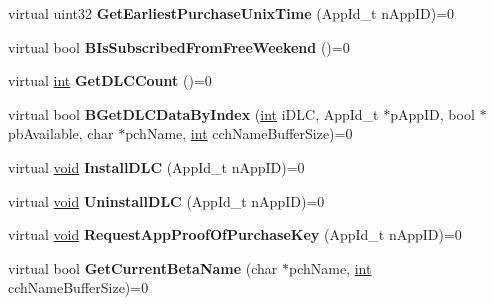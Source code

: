 \begin{DoxyCompactItemize}
\item 
\hypertarget{classISteamApps_ac1c6be2c2d7337812994ddb4d8c04bf0}{}virtual uint32 {\bfseries Get\+Earliest\+Purchase\+Unix\+Time} (App\+Id\+\_\+t n\+App\+I\+D)=0\label{classISteamApps_ac1c6be2c2d7337812994ddb4d8c04bf0}

\item 
\hypertarget{classISteamApps_a513d6e5bb54c2885557f104279c02672}{}virtual bool {\bfseries B\+Is\+Subscribed\+From\+Free\+Weekend} ()=0\label{classISteamApps_a513d6e5bb54c2885557f104279c02672}

\item 
\hypertarget{classISteamApps_ac8002fc5232fc1d28d88a95b925e2a72}{}virtual \hyperlink{SDL__thread_8h_a6a64f9be4433e4de6e2f2f548cf3c08e}{int} {\bfseries Get\+D\+L\+C\+Count} ()=0\label{classISteamApps_ac8002fc5232fc1d28d88a95b925e2a72}

\item 
\hypertarget{classISteamApps_a5ec35d2fc8a3966d003cc653c3fe8c4a}{}virtual bool {\bfseries B\+Get\+D\+L\+C\+Data\+By\+Index} (\hyperlink{SDL__thread_8h_a6a64f9be4433e4de6e2f2f548cf3c08e}{int} i\+D\+L\+C, App\+Id\+\_\+t $\ast$p\+App\+I\+D, bool $\ast$pb\+Available, char $\ast$pch\+Name, \hyperlink{SDL__thread_8h_a6a64f9be4433e4de6e2f2f548cf3c08e}{int} cch\+Name\+Buffer\+Size)=0\label{classISteamApps_a5ec35d2fc8a3966d003cc653c3fe8c4a}

\item 
\hypertarget{classISteamApps_a534d0b9be923296863471570cab33ba1}{}virtual \hyperlink{SDL__audio_8h_a52835ae37c4bb905b903cbaf5d04b05f}{void} {\bfseries Install\+D\+L\+C} (App\+Id\+\_\+t n\+App\+I\+D)=0\label{classISteamApps_a534d0b9be923296863471570cab33ba1}

\item 
\hypertarget{classISteamApps_abf17987da1339b115f719a29020cefdb}{}virtual \hyperlink{SDL__audio_8h_a52835ae37c4bb905b903cbaf5d04b05f}{void} {\bfseries Uninstall\+D\+L\+C} (App\+Id\+\_\+t n\+App\+I\+D)=0\label{classISteamApps_abf17987da1339b115f719a29020cefdb}

\item 
\hypertarget{classISteamApps_a0d2c29431c950b9b0dc3ee7749b65e4e}{}virtual \hyperlink{SDL__audio_8h_a52835ae37c4bb905b903cbaf5d04b05f}{void} {\bfseries Request\+App\+Proof\+Of\+Purchase\+Key} (App\+Id\+\_\+t n\+App\+I\+D)=0\label{classISteamApps_a0d2c29431c950b9b0dc3ee7749b65e4e}

\item 
\hypertarget{classISteamApps_a22f4f5850142d0db3f2c897863cbeead}{}virtual bool {\bfseries Get\+Current\+Beta\+Name} (char $\ast$pch\+Name, \hyperlink{SDL__thread_8h_a6a64f9be4433e4de6e2f2f548cf3c08e}{int} cch\+Name\+Buffer\+Size)=0\label{classISteamApps_a22f4f5850142d0db3f2c897863cbeead}


\end{DoxyCompactItemize}
